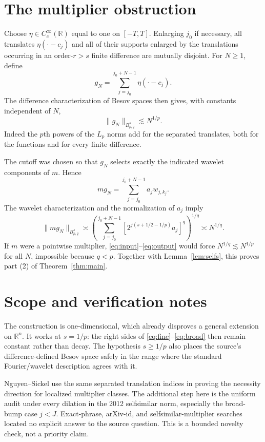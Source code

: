 \documentclass[9pt]{extarticle}
\newcommand{\R}{\mathbb R}
\begin{document}
\section{The multiplier obstruction}

Choose $\eta\in C_c^\infty(\R)$ equal to one on $[-T,T]$.  Enlarging
$j_0$ if necessary, all translates $\eta(\cdot-c_j)$ and all of their
supports enlarged by the translations occurring in an order-$r>s$
finite difference are mutually disjoint.  For $N\geq1$, define
\[
 g_N=\sum_{j=j_0}^{j_0+N-1}\eta(\cdot-c_j).
\]
The difference characterization of Besov spaces then gives, with constants
independent of $N$,
\begin{equation}\label{eq:input}
 \|g_N\|_{B^s_{p,q}}\lesssim N^{1/p}.
\end{equation}
Indeed the $p$th powers of the $L_p$ norms add for the separated
translates, both for the functions and for every finite difference.

The cutoff was chosen so that $g_N$ selects exactly the indicated wavelet
components of $m$.  Hence
\[
 mg_N=\sum_{j=j_0}^{j_0+N-1}a_jw_{j,k_j}.
\]
The wavelet characterization and the normalization of $a_j$ imply
\begin{equation}\label{eq:output}
 \|mg_N\|_{B^s_{p,q}}\asymp
 \left(\sum_{j=j_0}^{j_0+N-1}
 [2^{j(s+1/2-1/p)}a_j]^q\right)^{1/q}\asymp N^{1/q}.
\end{equation}
If $m$ were a pointwise multiplier,
\eqref{eq:input}--\eqref{eq:output} would force
$N^{1/q}\lesssim N^{1/p}$ for all $N$, impossible because $q<p$.
Together with Lemma~\ref{lem:selfs}, this proves part (2) of
Theorem~\ref{thm:main}.

\section{Scope and verification notes}

The construction is one-dimensional, which already disproves a general
extension on $\R^n$.  It works at $s=1/p$: the right sides of
\eqref{eq:fine}--\eqref{eq:broad}
then remain constant rather than decay.  The hypothesis $s\geq1/p$ also
places the source's difference-defined Besov space safely in the range
where the standard Fourier/wavelet description agrees with it.

Nguyen--Sickel use the same separated translation indices in proving the
necessity direction for localized multiplier classes.  The additional
step here is the uniform audit under every dilation in the 2012
selfsimilar norm, especially the broad-bump case $j<J$.  Exact-phrase,
arXiv-id, and selfsimilar-multiplier searches located no explicit answer
to the source question.  This is a bounded novelty check, not a priority
claim.
\end{document}
